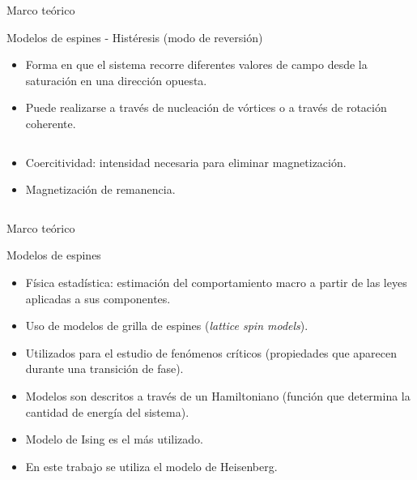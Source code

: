 \begin{frame}{Marco teórico}
\begin{block}{Modelos de espines - Histéresis (modo de reversión)}
\begin{itemize}
  \item Forma en que el sistema recorre diferentes valores de campo desde la saturación en una dirección opuesta.
  \item Puede realizarse a través de nucleación de vórtices o a través de rotación coherente.
\end{itemize}

\begin{columns}

  \begin{column}{.50\textwidth}
\begin{itemize}
  \item Coercitividad: intensidad necesaria para eliminar magnetización.
  \item Magnetización de remanencia.
\end{itemize}
  \end{column}
  
  \begin{column}{.50\textwidth}
	\centerline{}
  \end{column}
  
\end{columns}




\end{block}
\end{frame}

\begin{frame}{Marco teórico}
\begin{block}{Modelos de espines}
\begin{itemize}
  \item Física estadística: estimación del comportamiento macro a partir de las leyes aplicadas a sus componentes.
  \item Uso de modelos de grilla de espines (\textit{lattice spin models}).
  \item Utilizados para el estudio de fenómenos críticos (propiedades que aparecen durante una transición de fase).
  \item Modelos son descritos a través de un Hamiltoniano (función que determina la cantidad de energía del sistema).
  \item Modelo de Ising es el más utilizado.
  \item En este trabajo se utiliza el modelo de Heisenberg.
\end{itemize}
\end{block}
\end{frame}

